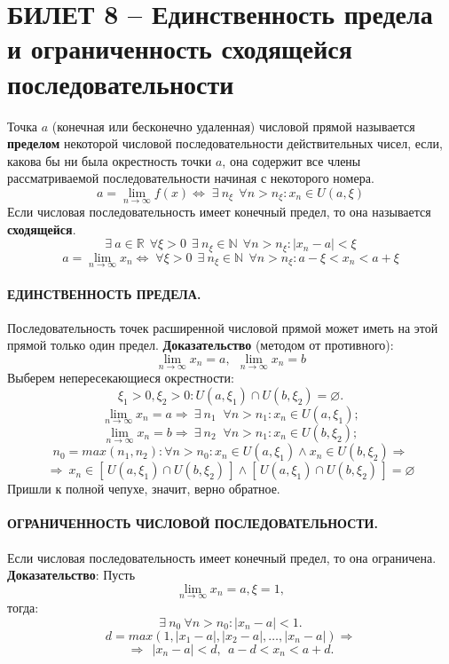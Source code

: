 \documentclass{article}
\newcommand{\numberset}[1]{\mathbb{#1}}
\newcommand{\N}{\numberset{N}}
\newcommand{\R}{\mathbb R}
\begin{document}
\section{БИЛЕТ 8 -- Единственность предела и ограниченность сходящейся последовательности}
Точка $a$ (конечная или бесконечно удаленная) числовой прямой называется \textbf{пределом} некоторой числовой последовательности действительных чисел, если, какова бы ни была окрестность точки $a$, она содержит все члены рассматриваемой последовательности начиная с некоторого номера.
$$a=\lim_{n\to\infty} f(x)\Leftrightarrow \; \exists \: n_{\xi} \:\: \forall n>n_{\xi} : x_{n} \in U(a, \xi)$$
Если числовая последовательность имеет конечный предел, то она называется \textbf{сходящейся}.
$$\exists \: a \in \R \:\: \forall \xi > 0 \:\: \exists \: n_{\xi} \in \N \:\: \forall n > n_{\xi} : |x_{n} - a|<\xi$$
$$ a=\lim_{n\to\infty} x_{n} \Leftrightarrow \; \forall \xi > 0 \:\:\exists \: n_{\xi} \in\N \:\:\forall n>n_{\xi} : a-\xi<x_{n}<a+\xi $$
\paragraph{ЕДИНСТВЕННОСТЬ ПРЕДЕЛА.}
Последовательность точек расширенной числовой прямой может иметь на этой прямой только один предел.
\newline
\newline
\textbf{Доказательство} (методом от противного):
$$ \lim_{n\to\infty} x_{n}=a, \:\: \lim_{n\to\infty} x_{n}=b $$
Выберем непересекающиеся окрестности: $$\xi_{1} > 0, \xi_{2}>0 : U(a,\xi_{1}) \cap U(b,\xi_{2}) = \varnothing .$$
$$ \lim_{n\to\infty} x_{n}=a \Rightarrow \: \exists \: n_{1} \;\; \forall n>n_{1} : x_{n}\in U(a,\xi_{1}); $$
$$ \lim_{n\to\infty} x_{n}=b \Rightarrow \: \exists \: n_{2} \;\; \forall n>n_{1} : x_{n}\in U(b,\xi_{2}); $$
$$ n_{0}=max(n_{1},n_{2}):\forall n>n_{0}:x_{n}\in U(a,\xi_{1}) \land x_{n}\in U(b, \xi_{2}) \Rightarrow $$
$$ \Rightarrow \: x_{n}\in [\,U(a,\xi_{1})\cap U(b,\xi_{2})\,]\land [\,U(a,\xi_{1})\cap U(b,\xi_{2})\,] = \varnothing$$
Пришли к полной чепухе, значит, верно обратное.
\paragraph{ОГРАНИЧЕННОСТЬ ЧИСЛОВОЙ ПОСЛЕДОВАТЕЛЬНОСТИ.}
Если числовая последовательность имеет конечный предел, то она ограничена. 
\newline
\newline
\textbf{Доказательство}:
\newline
Пусть $$\lim_{n\to\infty} x_{n}=a,\xi=1,$$ тогда:
$$ \exists \: n_{0} \:\forall n>n_{0} : |x_{n}-a|<1. $$
$$ d=max(1,|x_{1}-a|,|x_{2}-a|,\ldots,|x_{n}-a|) \Rightarrow $$
$$ \Rightarrow\:\:|x_{n}-a|<d,\:\:a-d<x_{n}<a+d. $$
\newpage
\end{document}

